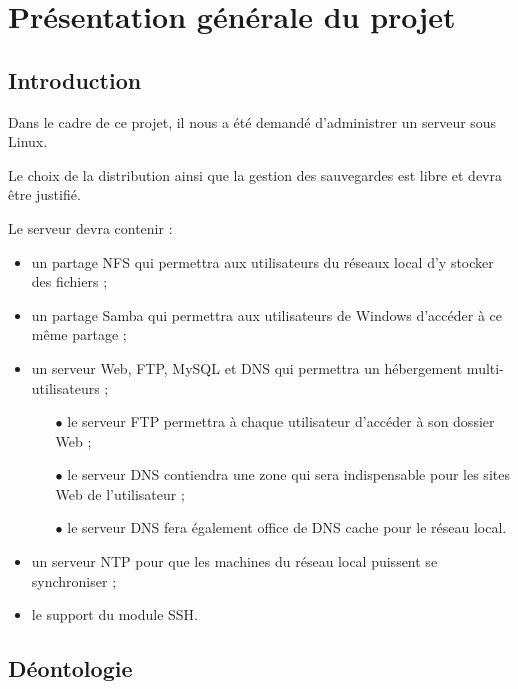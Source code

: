 \section{Présentation générale du projet}
\label{sec:pres-gener-du}

\subsection{Introduction}
\label{subsec:introduction}

Dans le cadre de ce projet, il nous a été demandé d'administrer un serveur sous
Linux.

Le choix de la distribution ainsi que la gestion des sauvegardes est libre et
devra être justifié.

Le serveur devra contenir :
\begin{itemize}
\item un partage NFS qui permettra aux utilisateurs du réseaux local d'y stocker
des fichiers ;

\item un partage Samba qui permettra aux utilisateurs de Windows d'accéder à ce
même partage ;

\item un serveur Web, FTP, MySQL et DNS qui permettra un hébergement
multi-utilisateurs ;
  \begin{itemize}
  \item[\tiny$\bullet$] le serveur FTP permettra à chaque utilisateur d'accéder
à son dossier Web ;
  \item[\tiny$\bullet$] le serveur DNS contiendra une zone qui sera
    indispensable pour les sites Web de l'utilisateur ;

  \item[\tiny$\bullet$] le serveur DNS fera également office de DNS cache pour
le réseau local.
  \end{itemize}

\item un serveur NTP pour que les machines du réseau local puissent se
synchroniser ;

\item le support du module SSH.
\end{itemize}

\newpage

\subsection{Déontologie}
\label{subsec:déontologie}

